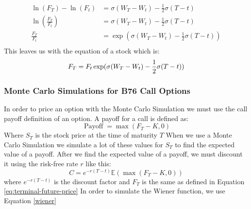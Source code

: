 \documentclass[12pt]{article}
\numberwithin{equation}{section}
\begin{document}
\begin{equation}
	\begin{aligned}
		\ln(F_T)-\ln(F_t)
		&=
		\sigma(W_T - W_t) - \frac{1}{2}\sigma(T-t) \\
		\ln\left(\frac{F_T}{F_t}\right)
		&=
		\sigma(W_T - W_t) - \frac{1}{2}\sigma(T-t) \\
		\frac{F_T}{F_t}
		&=
		\exp(
		\sigma(W_T - W_t) - \frac{1}{2}\sigma(T-t))
		 \\
	\end{aligned}
\end{equation}
This leaves us with the equation of a stock which is:
\begin{equation}
	F_T = F_t
	\exp(
	\sigma(W_T - W_t) - \frac{1}{2}\sigma(T-t))
	\\
	\label{eq:terminal-future-price}
\end{equation}


\subsubsection{Monte Carlo Simulations for B76 Call Options}
In order to price an option with the Monte Carlo Simulation we must use the call payoff definition of an option. A payoff for a call is defined as:
\begin{equation}
	\operatorname{Payoff} = \max(F_T - K, 0)
	\label{eq:payoffB76}
\end{equation}
Where $S_T$ is the stock price at the time of maturity $T$
\newline \newline
When we use a Monte Carlo Simulation we simulate a lot of these values for $S_T$ to find the expected value of a payoff. After we find the expected value of a payoff, we must discount it using the risk-free rate $r$ like this:
\begin{equation}
	C = e^{-r(T-t)} \mathbb{E}(\max(F_T - K, 0))
	\label{callMCb76}
\end{equation}
where $e^{-r(T-t)}$ is the discount factor and $F_T$ is the same as defined in Equation \ref{eq:terminal-future-price}
In order to simulate the Wiener function, we use Equation \ref{wiener}
\end{document}
